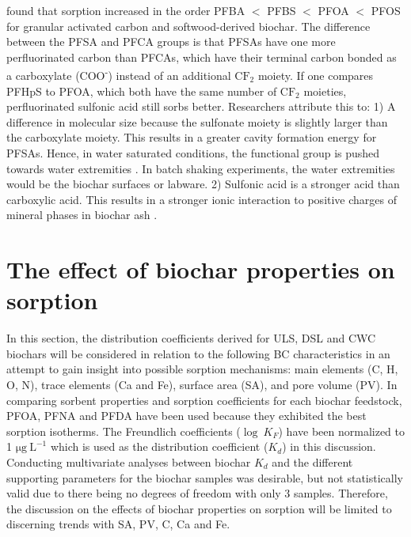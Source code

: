 \cite{zhang2021sorption} found that sorption increased in the order PFBA $<$ PFBS $<$ PFOA $<$ PFOS for granular activated carbon and softwood-derived biochar. The difference between the PFSA and PFCA groups is that PFSAs have one more perfluorinated carbon than PFCAs, which have their terminal carbon bonded as a carboxylate (COO\textsuperscript{-}) instead of an additional $\mathrm{CF_2}$ moiety. If one compares PFHpS to PFOA, which both have the same number of $\mathrm{CF_2}$ moieties, perfluorinated sulfonic acid still sorbs better. Researchers attribute this to: 1) A difference in molecular size because the sulfonate moiety is slightly larger than the carboxylate moiety. This results in a greater cavity formation energy for PFSAs. Hence, in water saturated conditions, the functional group is pushed towards water extremities \citep{yin2022insights,sigmund2022sorption}. In batch shaking experiments, the water extremities would be the biochar surfaces or labware. 2) Sulfonic acid is a stronger acid than carboxylic acid. This results in a stronger ionic interaction to positive charges of mineral phases in biochar ash \citep{arvaniti2015review}. 


\section{The effect of biochar properties on sorption}
In this section, the distribution coefficients derived for ULS, DSL and CWC biochars will be considered in relation to the following BC characteristics in an attempt to gain insight into possible sorption mechanisms: main elements (C, H, O, N), trace elements (Ca and Fe), surface area (\acrshort{SA}), and pore volume (\acrshort{PV}). In comparing sorbent properties and sorption coefficients for each biochar feedstock, PFOA, PFNA and PFDA have been used because they exhibited the best sorption isotherms. The Freundlich coefficients ($\log~K_F$) have been normalized to 1 $\mathrm{\mu g~L^{-1}}$ which is used as the distribution coefficient ($K_d$) in this discussion. Conducting multivariate analyses between biochar $K_d$ and the different supporting parameters for the biochar samples was desirable,  but not statistically valid due to there being no degrees of freedom with only 3 samples. Therefore, the discussion on the effects of biochar properties on sorption will be limited to discerning trends with SA, PV, C, Ca and Fe. 

